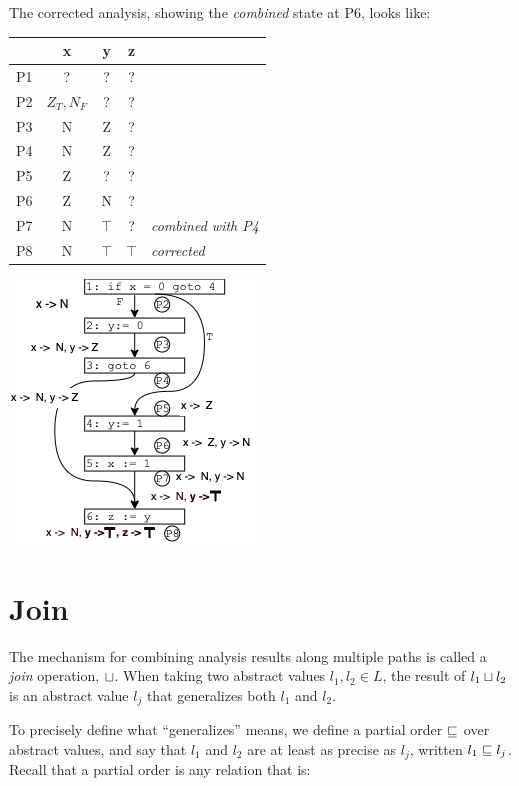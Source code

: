 \documentclass[11pt]{article}
\begin{document}
The corrected analysis, showing the \emph{combined} state at P6, looks like: 

\tablespace
\begin{center}
\begin{minipage}[t][-9.7em][b]{0.5\textwidth} %
\begin{tabular}{r | c c c l}
  & x & y & z \\
\hline
P1 & ? & ? & ? \\
P2 & $Z_T,N_F$ & ?  & ? \\
P3 & N & Z & ? \\
P4 & N & Z & ? \\
P5 & Z & ? & ?  \\
P6 & Z & N & ?  \\
P7 & N & $\top$ & ? & \textit{combined with P4} \\
P8 & N & $\top$ & $\top$ & \textit{corrected}\\
\end{tabular}
\end{minipage}
\hspace*{1em}
\includegraphics[scale=0.8]{images/altpathright}
\end{center}
\tablespace

\section{Join}

The mechanism for combining analysis results along multiple paths
is called a \emph{join} operation, $\sqcup$.  When taking two abstract values $l_1, l_2
\in L$, the result of $l_1 \sqcup l_2$ is an abstract value $l_j$ that
generalizes both $l_1$ and $l_2$.

To precisely define what ``generalizes'' means, we define a partial order $\sqsubseteq$
over abstract values, and say that $l_1$ and $l_2$ are at least as precise as
$l_j$, written $l_1 \sqsubseteq l_j$.  Recall that a partial order is any relation
that is:
\end{document}
